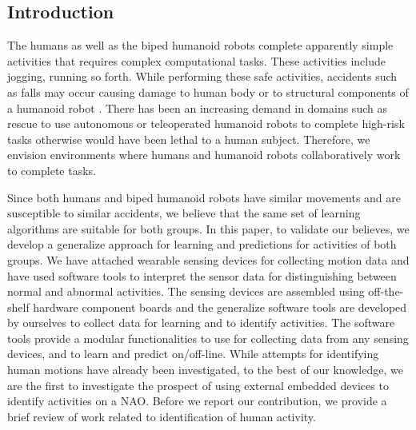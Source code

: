 \documentclass[letterpaper]{article}
\begin{document}
\begin{sloppy}
\section{Introduction}
\label{sec:Intro}
The humans as well as the biped humanoid robots complete apparently simple activities that requires 
complex computational tasks. These activities include jogging, running so forth. While performing 
these safe activities, accidents such as falls may occur causing damage to human body or to 
structural components of a humanoid robot \cite{li2009accurate}. There has been an 
increasing demand in domains such as rescue to use autonomous or teleoperated humanoid robots to 
complete high-risk tasks otherwise would have been lethal to a human subject. Therefore, we 
envision environments where humans and humanoid robots collaboratively work to complete 
tasks. 

Since both humans and biped humanoid robots have similar movements and are susceptible to 
similar accidents, we believe that the same set of learning algorithms are suitable for both 
groups. In this paper,  to validate our believes, we develop a generalize approach for learning 
and predictions for activities of both groups.  We have attached wearable sensing devices for 
collecting motion data and have used software tools to interpret the sensor data for distinguishing 
between normal and abnormal activities. The sensing devices are assembled using off-the-shelf 
hardware component boards and the generalize software tools are developed by ourselves to 
collect data for learning and to identify activities. The software tools provide a modular 
functionalities to use for collecting  data from any sensing devices, and to learn and predict 
on/off-line. While attempts for identifying human motions have already been investigated, to the 
best of our knowledge, we are the first to investigate the prospect of using external embedded 
devices to identify activities on a NAO. Before we report our contribution, we provide a brief 
review of work related to identification of human activity.  



\end{sloppy}
\end{document}
